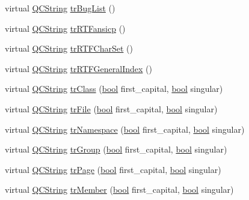 \begin{DoxyCompactItemize}
\item 
virtual \hyperlink{class_q_c_string}{Q\+C\+String} \hyperlink{class_translator_slovene_a9da501f9e0330e1d0c25eac47750da3b}{tr\+Bug\+List} ()
\item 
virtual \hyperlink{class_q_c_string}{Q\+C\+String} \hyperlink{class_translator_slovene_a381c8c7ad7fe0ea5379e1ed062ba0905}{tr\+R\+T\+Fansicp} ()
\item 
virtual \hyperlink{class_q_c_string}{Q\+C\+String} \hyperlink{class_translator_slovene_a3cb28c1244be75e56b524294bf30a5a6}{tr\+R\+T\+F\+Char\+Set} ()
\item 
virtual \hyperlink{class_q_c_string}{Q\+C\+String} \hyperlink{class_translator_slovene_a7bd53d66a1d9a5d62a8f4d8ba9923583}{tr\+R\+T\+F\+General\+Index} ()
\item 
virtual \hyperlink{class_q_c_string}{Q\+C\+String} \hyperlink{class_translator_slovene_aca83a7ce98fb83820789fd863622a564}{tr\+Class} (\hyperlink{qglobal_8h_a1062901a7428fdd9c7f180f5e01ea056}{bool} first\+\_\+capital, \hyperlink{qglobal_8h_a1062901a7428fdd9c7f180f5e01ea056}{bool} singular)
\item 
virtual \hyperlink{class_q_c_string}{Q\+C\+String} \hyperlink{class_translator_slovene_a2703261492b67ea49cb66a03c7169147}{tr\+File} (\hyperlink{qglobal_8h_a1062901a7428fdd9c7f180f5e01ea056}{bool} first\+\_\+capital, \hyperlink{qglobal_8h_a1062901a7428fdd9c7f180f5e01ea056}{bool} singular)
\item 
virtual \hyperlink{class_q_c_string}{Q\+C\+String} \hyperlink{class_translator_slovene_a917565a197344303ea7dbdaa12f946f2}{tr\+Namespace} (\hyperlink{qglobal_8h_a1062901a7428fdd9c7f180f5e01ea056}{bool} first\+\_\+capital, \hyperlink{qglobal_8h_a1062901a7428fdd9c7f180f5e01ea056}{bool} singular)
\item 
virtual \hyperlink{class_q_c_string}{Q\+C\+String} \hyperlink{class_translator_slovene_a18cdf07250591f1b7a1849201753b212}{tr\+Group} (\hyperlink{qglobal_8h_a1062901a7428fdd9c7f180f5e01ea056}{bool} first\+\_\+capital, \hyperlink{qglobal_8h_a1062901a7428fdd9c7f180f5e01ea056}{bool} singular)
\item 
virtual \hyperlink{class_q_c_string}{Q\+C\+String} \hyperlink{class_translator_slovene_ae26ecc1bf1bbe892497d347910bd930f}{tr\+Page} (\hyperlink{qglobal_8h_a1062901a7428fdd9c7f180f5e01ea056}{bool} first\+\_\+capital, \hyperlink{qglobal_8h_a1062901a7428fdd9c7f180f5e01ea056}{bool} singular)
\item 
virtual \hyperlink{class_q_c_string}{Q\+C\+String} \hyperlink{class_translator_slovene_a49065c4a9a2eec3961a47bc069f8fcd7}{tr\+Member} (\hyperlink{qglobal_8h_a1062901a7428fdd9c7f180f5e01ea056}{bool} first\+\_\+capital, \hyperlink{qglobal_8h_a1062901a7428fdd9c7f180f5e01ea056}{bool} singular)

\end{DoxyCompactItemize}
